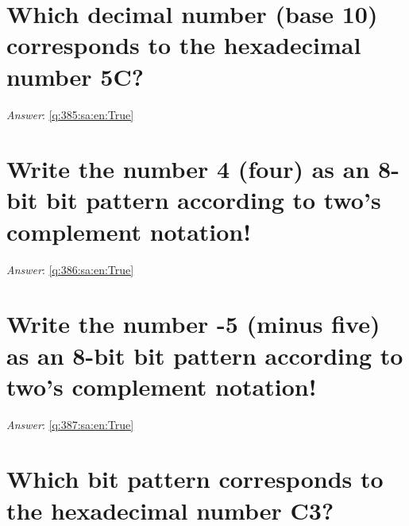 \documentclass[a4paper,11pt,oneside]{book}
\begin{document}
\begin{sloppypar}
\section{Which decimal number (base 10) corresponds to the hexadecimal number 5C?}

\label{q:385:sa:en:False}

\vspace{2cm}

\noindent\makebox[\textwidth]{\hrulefill}

\vspace{1cm}

\textit{Answer}: \autoref{q:385:sa:en:True}



\section{Write the number 4 (four) as an 8-bit bit pattern according to two's complement notation!}

\label{q:386:sa:en:False}

\vspace{2cm}

\noindent\makebox[\textwidth]{\hrulefill}

\vspace{1cm}

\textit{Answer}: \autoref{q:386:sa:en:True}



\section{Write the number -5 (minus five) as an 8-bit bit pattern according to two's complement notation!}

\label{q:387:sa:en:False}

\vspace{2cm}

\noindent\makebox[\textwidth]{\hrulefill}

\vspace{1cm}

\textit{Answer}: \autoref{q:387:sa:en:True}



\section{Which bit pattern corresponds to the hexadecimal number C3?}

\label{q:388:sa:en:False}


\end{sloppypar}
\end{document}
